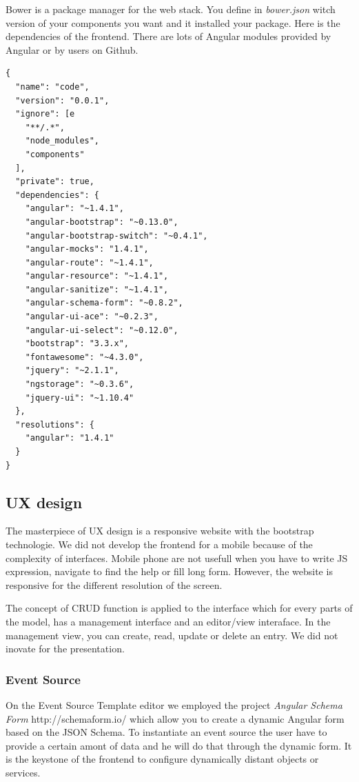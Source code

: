 Bower is a package manager for the web stack. You define in \emph{bower.json} witch version of your components you want and it installed your package. Here is the dependencies of the frontend. There are lots of Angular modules provided by Angular or by users on Github. 

\begin{lstlisting}
{
  "name": "code",
  "version": "0.0.1",
  "ignore": [e
    "**/.*",
    "node_modules",
    "components"
  ],
  "private": true,
  "dependencies": {
    "angular": "~1.4.1",
    "angular-bootstrap": "~0.13.0",
    "angular-bootstrap-switch": "~0.4.1",
    "angular-mocks": "1.4.1",
    "angular-route": "~1.4.1",
    "angular-resource": "~1.4.1",
    "angular-sanitize": "~1.4.1",
    "angular-schema-form": "~0.8.2",
    "angular-ui-ace": "~0.2.3",
    "angular-ui-select": "~0.12.0",
    "bootstrap": "3.3.x",
    "fontawesome": "~4.3.0",
    "jquery": "~2.1.1",
    "ngstorage": "~0.3.6",
    "jquery-ui": "~1.10.4"
  },
  "resolutions": {
    "angular": "1.4.1"
  }
}
\end{lstlisting}

\subsection{UX design}
The masterpiece of UX design is a responsive website with the bootstrap technologie. We did not develop the frontend for a mobile because of the complexity of interfaces. Mobile phone are not usefull when you have to write JS expression, navigate to find the help or fill long form. However, the website is responsive for the different resolution of the screen. 

The concept of CRUD function is applied to the interface which for every parts of the model, has a management interface and an editor/view interaface. In the management view, you can create, read, update or delete an entry. We did not inovate for the presentation. 

\subsubsection{Event Source}
On the Event Source Template editor we employed the project \emph{Angular Schema Form} http://schemaform.io/ which allow you to create a dynamic Angular form based on the JSON Schema. To instantiate an event source the user have to provide a certain amont of data and he will do that through the dynamic form. It is the keystone of the frontend to configure dynamically distant objects or services. 


